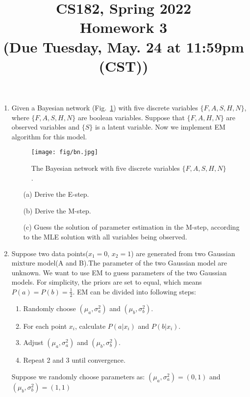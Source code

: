 \documentclass[10pt]{article}
\begin{document}
\date{}
\title{CS182, Spring 2022 \\
	Homework 3\\
	\small (Due Tuesday, May. 24 at 11:59pm (CST))}
\maketitle
\begin{enumerate}


	\item {} Given a Bayesian network (Fig.~\ref{fig3}) with five discrete variables $\{F,A,S,H,N\}$,
	      where $\{F,A,S,H,N\}$ are boolean variables.
	      Suppose that $\{F,A,H,N\}$ are observed variables and $\{S\}$ is a latent variable.
	      Now we implement EM algorithm for this model.
	      \begin{figure}[h!]
		      \centering
		      \texttt{[image: fig/bn.jpg]}
		      \label{fig3}
		      \caption{The Bayesian network with five discrete variables $\{F,A,S,H,N\}$.}
	      \end{figure}
	      \begin{itemize}
		      \item[(a)] Derive the E-step. ~ \\
		      \item[(b)] Derive the M-step. ~ \\
		      \item[(c)] Guess the solution of parameter estimation in the M-step, according to the MLE solution with all variables being observed. ~ \\
	      \end{itemize}

	      \newpage

	    \item {}
	        Suppose two data points($x_1 = 0$, $x_2 = 1$) are generated from two Gaussian mixture model(A and B).The parameter of the two Gaussian model are unknown. We want to use EM to guess parameters of the two Gaussian models. For simplicity, the priors are set to equal, which means $P(a) = P(b) = \frac{1}{2}$.
            EM can be divided into following steps:
            \begin{enumerate}
                \item Randomly choose $(\mu_a, \sigma_a^2)$ and $(\mu_b, \sigma_b^2)$.
                \item For each point $x_i$, calculate $P(a|x_i)$ and $P(b|x_i)$.
                \item Adjust $(\mu_a, \sigma_a^2)$ and $(\mu_b, \sigma_b^2)$.
                \item Repeat 2 and 3 until convergence.
            \end{enumerate}
            Suppose we randomly choose parameters as: $(\mu_a, \sigma_a^2) = (0, 1)$ and $(\mu_b, \sigma_b^2) = (1, 1)$


\end{enumerate}
\end{document}
